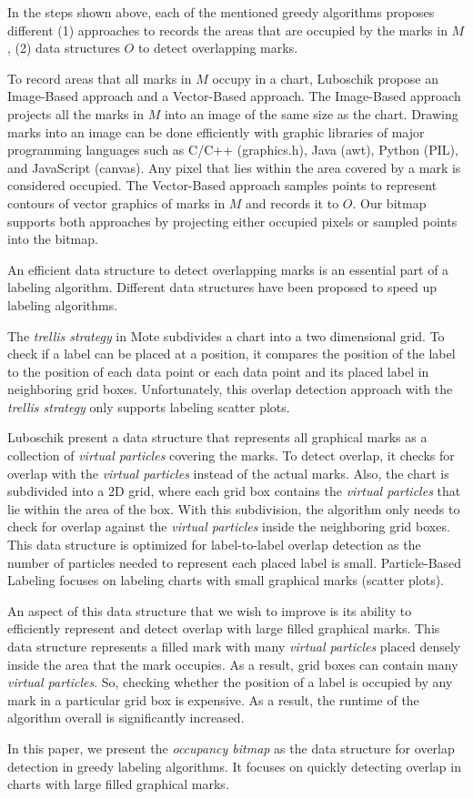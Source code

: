 In the steps shown above, each of the mentioned greedy algorithms proposes different
(1) approaches to records the areas that are occupied by the marks in $M$,
(2) data structures $O$ to detect overlapping marks.

To record areas that all marks in $M$ occupy in a chart, Luboschik \ea \cite{luboschik:particle} propose an Image-Based approach and a Vector-Based approach.
The Image-Based approach projects all the marks in $M$ into an image of the same size as the chart.
Drawing marks into an image can be done efficiently with graphic libraries of major programming languages such as C/C++ (graphics.h), Java (awt), Python (PIL), and JavaScript (canvas).
Any pixel that lies within the area covered by a mark is considered occupied.
The Vector-Based approach samples points to represent contours of vector graphics of marks in $M$ and records it to $O$.
Our bitmap supports both approaches by projecting either occupied pixels or sampled points into the bitmap.

An efficient data structure to detect overlapping marks is an essential part of a labeling algorithm.
Different data structures have been proposed to speed up labeling algorithms.

The \emph{trellis strategy} in Mote \ea \cite{mote:informed-greedy} subdivides a chart into a two dimensional grid.
To check if a label can be placed at a position, it compares the position of the label to the position of each data point or each data point and its placed label in neighboring grid boxes.
Unfortunately, this overlap detection approach with the \emph{trellis strategy} only supports labeling scatter plots.

Luboschik \ea \cite{luboschik:particle} present a data structure that represents all graphical marks as a collection of \emph{virtual particles} covering the marks.
To detect overlap, it checks for overlap with the \emph{virtual particles} instead of the actual marks.
Also, the chart is subdivided into a 2D grid,
where each grid box contains the \emph{virtual particles} that lie within the area of the box.
With this subdivision, the algorithm only needs to check for overlap against the \emph{virtual particles} inside the neighboring grid boxes.
This data structure is optimized for label-to-label overlap detection as the number of particles needed to represent each placed label is small.
Particle-Based Labeling focuses on labeling charts with small graphical marks (\eg scatter plots).

An aspect of this data structure that we wish to improve is its ability to efficiently represent and detect overlap with large filled graphical marks.
This data structure represents a filled mark with many \emph{virtual particles} placed densely inside the area that the mark occupies.
As a result, grid boxes can contain many \emph{virtual particles}.
So, checking whether the position of a label is occupied by any mark in a particular grid box is expensive.
As a result, the runtime of the algorithm overall is significantly increased.

In this paper, we present the \emph{occupancy bitmap} as the data structure for overlap detection in greedy labeling algorithms.
It focuses on quickly detecting overlap in charts with large filled graphical marks.
